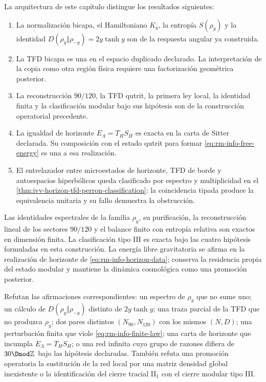 La arquitectura de este cap\'itulo distingue los resultados siguientes:
\begin{enumerate}[label=\textup{(\roman*)}]
 \item La normalizaci\'on bicapa, el Hamiltoniano
 \(K_y\), la entrop\'ia
 \(S(\rho_y)\) y la identidad
 \(D(\rho_y\Vert\rho_{-y})=2y\tanh y\) son
  de la respuesta angular ya
 construida.
 \item La TFD bicapa es una  en el
 espacio duplicado declarado. La interpretaci\'on de la copia como otra
 regi\'on f\'isica requiere una factorizaci\'on geom\'etrica posterior.
 \item La reconstrucci\'on \(90/120\), la TFD qutrit, la primera ley local,
 la identidad finita y la clasificaci\'on modular bajo sus hip\'otesis son
  de la construcción operatorial precedente.
 \item La igualdad de horizonte
 \(E_\Lambda=T_HS_H\) es exacta en la carta de Sitter declarada. Su
 composici\'on con el estado qutrit para formar
 \cref{eq:rm-info-free-energy} es una
  a esa realizaci\'on.
 \item El entrelazador entre microestados de horizonte, TFD de borde y
 autoespacios hiperb\'olicos queda clasificado por espectro y multiplicidad
 en el \cref{thm:ivv-horizon-tfd-perron-classification}: la coincidencia
 tipada produce la equivalencia unitaria y su fallo demuestra la obstrucci\'on.
\end{enumerate}

\begin{proofstatusbox}
Las identidades espectrales de la familia \(\rho_y\), su purificaci\'on,
la reconstrucci\'on lineal de los sectores \(90/120\) y el balance finito
con entrop\'ia relativa son exactos en dimensi\'on finita. La clasificaci\'on
tipo III es exacta bajo las cuatro hip\'otesis formuladas en esta construcción.
La energ\'ia libre gravitatoria se afirma en la realizaci\'on de horizonte de
\cref{eq:rm-info-horizon-data}; conserva la residencia propia del estado
modular y mantiene la din\'amica cosmol\'ogica como una promoci\'on posterior.
\end{proofstatusbox}

\begin{falsifierbox}
Refutan las afirmaciones correspondientes: un espectro de \(\rho_y\) que no
sume uno; un c\'alculo de
\(D(\rho_y\Vert\rho_{-y})\) distinto de \(2y\tanh y\); una traza parcial de
la TFD que no produzca \(\rho_y\); dos pares distintos
\((N_{90},N_{120})\) con los mismos \((N,D)\); una perturbaci\'on finita
que viole \cref{eq:rm-info-finite-law}; una carta de horizonte que incumpla
\(E_\Lambda=T_HS_H\); o una red infinita cuyo grupo de razones difiera de
\(30\Dmod\mathbb Z\) bajo las hip\'otesis declaradas. Tambi\'en refuta una
promoci\'on operatoria la sustituci\'on de la red local por una matriz densidad
global inexistente o la identificaci\'on del cierre tracial II\(_1\) con el
cierre modular tipo III.
\end{falsifierbox}
